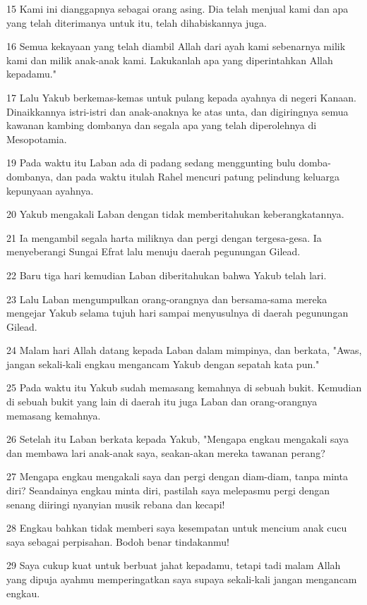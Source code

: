 \par 15 Kami ini dianggapnya sebagai orang asing. Dia telah menjual kami dan apa yang telah diterimanya untuk itu, telah dihabiskannya juga.
\par 16 Semua kekayaan yang telah diambil Allah dari ayah kami sebenarnya milik kami dan milik anak-anak kami. Lakukanlah apa yang diperintahkan Allah kepadamu."
\par 17 Lalu Yakub berkemas-kemas untuk pulang kepada ayahnya di negeri Kanaan. Dinaikkannya istri-istri dan anak-anaknya ke atas unta, dan digiringnya semua kawanan kambing dombanya dan segala apa yang telah diperolehnya di Mesopotamia.
\par 19 Pada waktu itu Laban ada di padang sedang menggunting bulu domba-dombanya, dan pada waktu itulah Rahel mencuri patung pelindung keluarga kepunyaan ayahnya.
\par 20 Yakub mengakali Laban dengan tidak memberitahukan keberangkatannya.
\par 21 Ia mengambil segala harta miliknya dan pergi dengan tergesa-gesa. Ia menyeberangi Sungai Efrat lalu menuju daerah pegunungan Gilead.
\par 22 Baru tiga hari kemudian Laban diberitahukan bahwa Yakub telah lari.
\par 23 Lalu Laban mengumpulkan orang-orangnya dan bersama-sama mereka mengejar Yakub selama tujuh hari sampai menyusulnya di daerah pegunungan Gilead.
\par 24 Malam hari Allah datang kepada Laban dalam mimpinya, dan berkata, "Awas, jangan sekali-kali engkau mengancam Yakub dengan sepatah kata pun."
\par 25 Pada waktu itu Yakub sudah memasang kemahnya di sebuah bukit. Kemudian di sebuah bukit yang lain di daerah itu juga Laban dan orang-orangnya memasang kemahnya.
\par 26 Setelah itu Laban berkata kepada Yakub, "Mengapa engkau mengakali saya dan membawa lari anak-anak saya, seakan-akan mereka tawanan perang?
\par 27 Mengapa engkau mengakali saya dan pergi dengan diam-diam, tanpa minta diri? Seandainya engkau minta diri, pastilah saya melepasmu pergi dengan senang diiringi nyanyian musik rebana dan kecapi!
\par 28 Engkau bahkan tidak memberi saya kesempatan untuk mencium anak cucu saya sebagai perpisahan. Bodoh benar tindakanmu!
\par 29 Saya cukup kuat untuk berbuat jahat kepadamu, tetapi tadi malam Allah yang dipuja ayahmu memperingatkan saya supaya sekali-kali jangan mengancam engkau.
